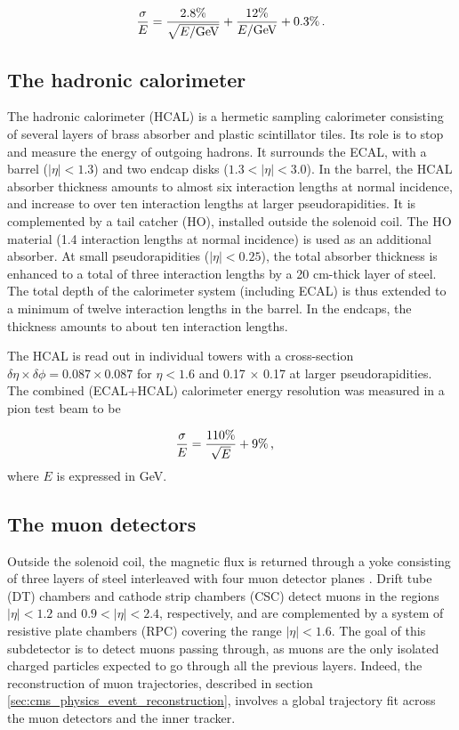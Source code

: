 \begin{equation}
    \frac{\sigma}{E} = \frac{2.8\%}{\sqrt{E / \mathrm{GeV}}} + \frac{12\%}{E / \mathrm{GeV}} + 0.3\% \mend
\end{equation}

\subsection{The hadronic calorimeter}

The hadronic calorimeter (HCAL) \cite{CERN-LHCC-97-031} is a hermetic sampling calorimeter consisting of several layers of brass absorber and plastic scintillator tiles. Its role is to stop and measure the energy of outgoing hadrons. It surrounds the ECAL, with a barrel ($|\eta| < 1.3$) and two endcap disks ($1.3 < |\eta| < 3.0$). In the barrel, the HCAL absorber thickness amounts to almost six interaction lengths at normal incidence, and increase to over ten interaction lengths at larger pseudorapidities. It is complemented by a tail catcher (HO), installed outside the solenoid coil. The HO material (1.4 interaction lengths at normal incidence) is used as an additional absorber. At small pseudorapidities ($|\eta| < 0.25$), the total absorber thickness is enhanced to a total of three interaction lengths by a 20 cm-thick layer of steel. The total depth of the calorimeter system (including ECAL) is thus extended to a minimum of twelve interaction lengths in the barrel. In the endcaps, the thickness amounts to about ten interaction lengths.

The HCAL is read out in individual towers with a cross-section $\delta\eta \times \delta\phi = 0.087 \times 0.087$ for $\eta < 1.6$ and 0.17 $\times$ 0.17 at larger pseudorapidities. The combined (ECAL+HCAL) calorimeter energy resolution was measured in a pion test beam to be 

\begin{equation}
    \frac{\sigma}{E} = \frac{110 \%}{\sqrt{E}} + 9\% \msep
\end{equation}
where $E$ is expressed in GeV.
\subsection{The muon detectors}

Outside the solenoid coil, the magnetic flux is returned through a yoke consisting of three layers of steel interleaved with four muon detector planes \cite{CERN-LHCC-97-032,collaboration_2013}. Drift tube (DT) chambers and cathode strip chambers (CSC) detect muons in the regions $|\eta| < 1.2$ and $0.9 < |\eta| < 2.4$, respectively, and are complemented by a system of resistive plate chambers (RPC) covering the range $|\eta| < 1.6$. The goal of this subdetector is to detect muons passing through, as muons are the only isolated charged particles expected to go through all the previous layers. Indeed, the reconstruction of muon trajectories, described in section \ref{sec:cms_physics_event_reconstruction}, involves a global trajectory fit across the muon detectors and the inner tracker.

